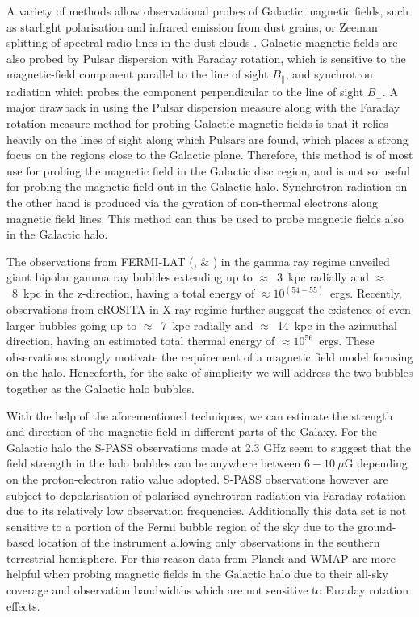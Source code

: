 \documentclass[usenatbib]{mnras}
\begin{document}
A variety of methods allow observational probes of Galactic magnetic fields, such as starlight polarisation and infrared emission from dust grains, or Zeeman splitting of spectral radio lines in the dust clouds \cite{Beck_2007}. Galactic magnetic fields are also probed by Pulsar dispersion with Faraday rotation, which is sensitive to the magnetic-field component parallel to the line of sight $B_{\parallel}$, and synchrotron radiation which probes the component perpendicular to the line of sight $B_{\perp}$. A major drawback in using the Pulsar dispersion measure along with the Faraday rotation measure method for probing Galactic magnetic fields is that it relies heavily on the lines of sight along which Pulsars are found, which places a strong focus on the regions close to the Galactic plane. Therefore, this method is of most use for probing the magnetic field in the Galactic disc region, and is not so useful for probing the magnetic field out in the Galactic halo. Synchrotron radiation on the other hand is produced via the gyration of non-thermal electrons along magnetic field lines. This method can thus be used to probe magnetic fields also in the Galactic halo.

The observations from FERMI-LAT (\cite{Dobler_2010}, \cite{Su_2010} \& \cite{Su_2012}) in the gamma ray regime unveiled giant bipolar gamma ray bubbles extending up to $\approx$~3~kpc radially and $\approx$~8~kpc in the z-direction, having a total energy of $\approx 10^{(54-55)}$~ergs. Recently, observations from eROSITA \cite{eROSITA} in X-ray regime further suggest the existence of even larger bubbles going up to  $\approx$~7~kpc radially and $\approx$~14~kpc in the azimuthal direction, having an estimated total thermal energy of $\approx 10^{56}$~ergs. These observations strongly motivate the requirement of a magnetic field model focusing on the halo. Henceforth, for the sake of simplicity we will address the two bubbles together as the Galactic halo bubbles.

With the help of the aforementioned techniques, we can estimate the strength and direction of the magnetic field in different parts of the Galaxy. 
For the Galactic halo the S-PASS \cite{Carretti_2013} observations  made at 2.3 GHz seem to suggest that the field strength in the halo bubbles can be anywhere between $6-10~\mu $G depending on the proton-electron ratio value adopted. S-PASS \cite{Carretti_2013} observations however are subject to depolarisation of polarised synchrotron radiation via Faraday rotation due to its relatively low observation frequencies. Additionally this data set is not sensitive to a portion of the Fermi bubble region of the sky due to the ground-based location of the instrument allowing only observations in the southern terrestrial hemisphere. For this reason data from Planck and WMAP are more helpful when probing magnetic fields in the Galactic halo due to their all-sky coverage and observation bandwidths which are not sensitive to Faraday rotation effects.
\end{document}
